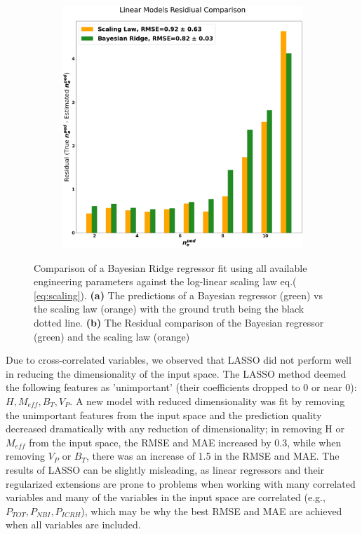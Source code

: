 \documentclass[a4paper, twoside, final, 12pt]{article}
\begin{document}
{\begin{figure}[hb!]
\begin{subfigure}{0.495\linewidth}
		\includegraphics[scale=0.13]{./src/linear_comp}
				\caption{}
		\label{subfig:bayes_resid}
	\end{subfigure}\hfill
	\caption{Comparison of a Bayesian Ridge regressor fit using all available engineering parameters against the log-linear scaling law eq.\;( \ref{eq:scaling}). \textbf{(a)} The predictions of a Bayesian regressor (green) vs the scaling law (orange) with the ground truth being the black dotted line. \textbf{(b)} The Residual comparison of the Bayesian regressor (green) and the scaling law (orange) }
	\label{fig:lin_reg}
\end{figure}

Due to cross-correlated variables, we observed that LASSO did not perform well in reducing the dimensionality of the input space. The LASSO method deemed the following features as 'unimportant' (their coefficients dropped to 0 or near 0): $H, M_{eff}, B_T, V_P$. A new model with reduced dimensionality was fit by removing the unimportant features from the input space and the prediction quality decreased dramatically with any reduction of dimensionality; in removing H or $M_{eff}$ from the input space, the RMSE and MAE increased by 0.3, while when removing $V_P$ or $B_T$, there was an increase of 1.5 in the RMSE and MAE. 
The results of LASSO can be slightly misleading, as linear regressors and their regularized extensions are prone to problems when working with many correlated variables and many of the variables in the input space are correlated (e.g., $P_{TOT}, P_{NBI}, P_{ICRH}$), which may be why the best RMSE and MAE are achieved when all variables are included.


}
\end{document}
